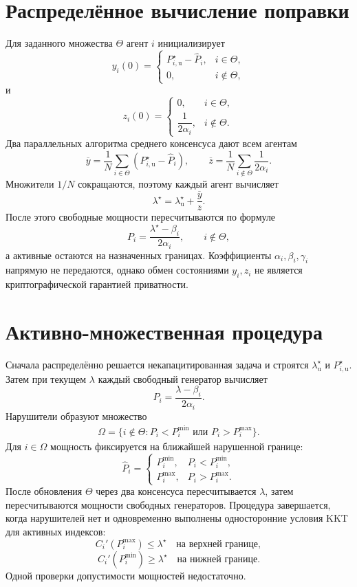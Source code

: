 \section{Распределённое вычисление поправки}

Для заданного множества \(\Theta\) агент \(i\) инициализирует
\[
    y_i(0)
    =
    \begin{cases}
        P_{i,\mathrm u}^\star-\widehat P_i,
        &i\in\Theta,\\[1mm]
        0,
        &i\notin\Theta,
    \end{cases}
\]
и
\[
    z_i(0)
    =
    \begin{cases}
        0,
        &i\in\Theta,\\[1mm]
        \dfrac1{2\alpha_i},
        &i\notin\Theta.
    \end{cases}
\]
Два параллельных алгоритма среднего консенсуса дают всем агентам
\[
    \overline y
    =
    \frac1N
    \sum_{i\in\Theta}
    \left(P_{i,\mathrm u}^\star-\widehat P_i\right),
    \qquad
    \overline z
    =
    \frac1N
    \sum_{i\notin\Theta}
    \frac1{2\alpha_i}.
\]
Множители \(1/N\) сокращаются, поэтому каждый агент вычисляет
\[
    \lambda^\star
    =
    \lambda_{\mathrm u}^\star
    +
    \frac{\overline y}{\overline z}.
\]
После этого свободные мощности пересчитываются по формуле
\[
    P_i
    =
    \frac{\lambda^\star-\beta_i}{2\alpha_i},
    \qquad i\notin\Theta,
\]
а активные остаются на назначенных границах. Коэффициенты
\(\alpha_i,\beta_i,\gamma_i\) напрямую не передаются, однако обмен
состояниями \(y_i,z_i\) не является криптографической гарантией
приватности.

\section{Активно-множественная процедура}

Сначала распределённо решается некапацитированная задача и строятся
\(\lambda_{\mathrm u}^\star\) и \(P_{i,\mathrm u}^\star\). Затем при
текущем \(\lambda\) каждый свободный генератор вычисляет
\[
    P_i=\frac{\lambda-\beta_i}{2\alpha_i}.
\]
Нарушители образуют множество
\[
\begin{aligned}
    \Omega
    =
    \bigl\{
        i\notin\Theta:
        P_i<P_i^{\min}
        \text{ или }
        P_i>P_i^{\max}
    \bigr\}.
\end{aligned}
\]
Для \(i\in\Omega\) мощность фиксируется на ближайшей нарушенной
границе:
\[
    \widehat P_i
    =
    \begin{cases}
        P_i^{\min},&P_i<P_i^{\min},\\[1mm]
        P_i^{\max},&P_i>P_i^{\max}.
    \end{cases}
\]
После обновления \(\Theta\) через два консенсуса пересчитывается
\(\lambda\), затем пересчитываются мощности свободных генераторов.
Процедура завершается, когда нарушителей нет и одновременно выполнены
односторонние условия KKT для активных индексов:
\[
    C_i'(P_i^{\max})\le\lambda^\star
    \quad\text{на верхней границе},
\]
\[
    C_i'(P_i^{\min})\ge\lambda^\star
    \quad\text{на нижней границе}.
\]
Одной проверки допустимости мощностей недостаточно.

